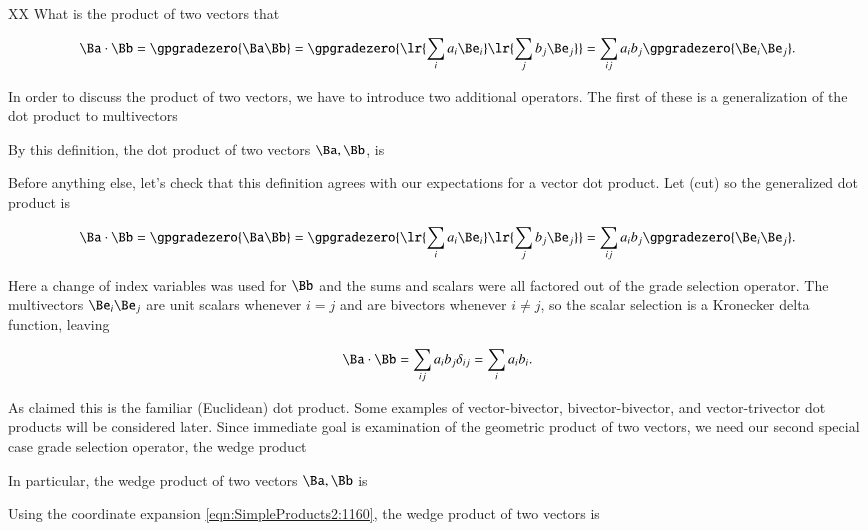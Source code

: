 XX
What is the product of two vectors that

\begin{dmath}\label{eqn:SimpleProducts2:1180}
\Ba \cdot \Bb
=
\gpgradezero{ \Ba \Bb }
=
\gpgradezero{ \lr{ \sum_i a_i \Be_i }
\lr{ \sum_j b_j \Be_j }
}
=
\sum_{ij} a_i b_j \gpgradezero{ \Be_i \Be_j }.
\end{dmath}


In order to discuss the product of two vectors, we have to introduce two additional operators.  The first of these is a generalization of the dot product to multivectors

By this definition, the dot product of two vectors \( \Ba, \Bb \), is


Before anything else, let's check that this definition agrees with our expectations for a vector dot product.  Let
(cut)
so the generalized dot product is

\begin{dmath}\label{eqn:SimpleProducts2:1560}
\Ba \cdot \Bb
=
\gpgradezero{ \Ba \Bb }
=
\gpgradezero{ \lr{ \sum_i a_i \Be_i }
\lr{ \sum_j b_j \Be_j }
}
=
\sum_{ij} a_i b_j \gpgradezero{ \Be_i \Be_j }.
\end{dmath}

Here a change of index variables was used for \( \Bb \) and the sums and scalars were all factored out of the grade selection operator.  The multivectors \( \Be_i \Be_j \) are unit scalars whenever \( i = j \) and are bivectors whenever \( i \ne j \), so the scalar selection is a Kronecker delta function, leaving

\begin{dmath}\label{eqn:SimpleProducts2:1200}
\Ba \cdot \Bb
=
\sum_{ij} a_i b_j \delta_{ij}
=
\sum_{i} a_i b_i.
\end{dmath}

As claimed this is the familiar (Euclidean) dot product.
Some examples of vector-bivector, bivector-bivector, and vector-trivector dot products will be considered later.
Since immediate goal is examination of the geometric product of two vectors, we need our second special case grade selection operator, the wedge product


In particular, the wedge product of two vectors \( \Ba, \Bb \) is


Using the coordinate expansion \cref{eqn:SimpleProducts2:1160}, the wedge product of two vectors is

